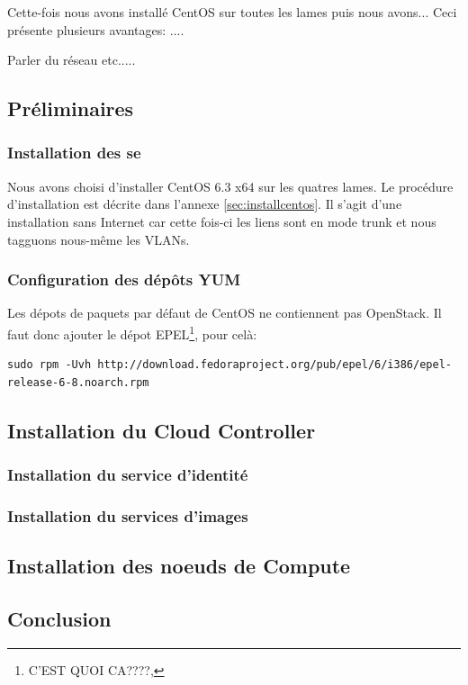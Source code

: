 \documentclass[a4paper,oneside]{report}
\begin{document}
Cette-fois nous avons installé CentOS sur toutes les lames puis nous avons...
Ceci présente plusieurs avantages: ....

Parler du réseau etc.....

\subsection{Préliminaires}
\subsubsection{Installation des \gls{se}}
Nous avons choisi d'installer CentOS 6.3 x64 sur les quatres lames. Le procédure d'installation est décrite dans l'annexe \ref{sec:installcentos}.\newline
Il s'agit d'une installation sans Internet car cette fois-ci les liens sont en mode trunk et nous tagguons nous-même les VLANs.

\subsubsection{Configuration des dépôts YUM}
Les dépots de paquets par défaut de CentOS ne contiennent pas OpenStack. Il faut donc ajouter le dépot EPEL\footnote{C'EST QUOI CA????,}, pour celà:
\begin{verbatim}
sudo rpm -Uvh http://download.fedoraproject.org/pub/epel/6/i386/epel-release-6-8.noarch.rpm
\end{verbatim}

\subsection{Installation du Cloud Controller}
\subsubsection{Installation du service d'identité}

\subsubsection{Installation du services d'images}

\subsection{Installation des noeuds de Compute}



\subsection{Conclusion}
\end{document}
